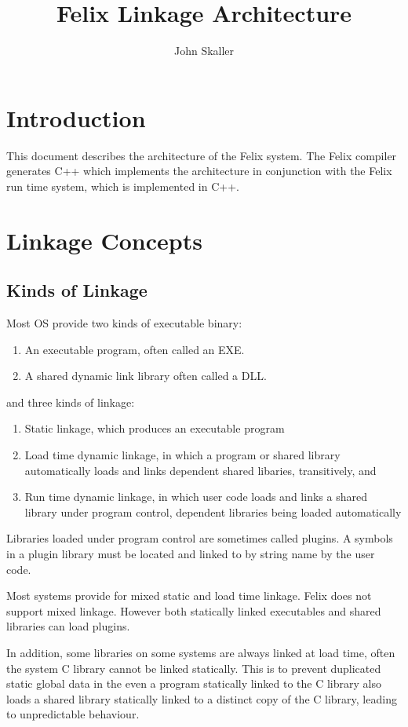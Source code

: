 \documentclass[oneside]{book}
\title{Felix Linkage Architecture}
\author{John Skaller}
\begin{document}
\maketitle
\tableofcontents
\chapter{Introduction}
This document describes the architecture of the Felix system.
The Felix compiler generates C++ which implements the architecture
in conjunction with the Felix run time system, which is implemented in C++.

\chapter{Linkage Concepts}
\section{Kinds of Linkage}
Most OS provide two kinds of executable binary: 
\begin{enumerate}
\item An executable program, often called an EXE.
\item A shared dynamic link library often called a DLL.
\end{enumerate}

and three kinds of linkage:

\begin{enumerate}
\item Static linkage, which produces an executable program
\item Load time dynamic linkage, in which a program or shared library
automatically loads and links dependent shared libaries, transitively, and
\item Run time dynamic linkage, in which user code loads and links a
shared library under program control, dependent libraries being
loaded automatically
\end{enumerate}

Libraries loaded under program control are sometimes called
plugins. A symbols in a plugin library must be located and
linked to by string name by the user code.

Most systems provide for mixed static and load time linkage.
Felix does not support mixed linkage. However both statically linked
executables and shared libraries can load plugins.

In addition, some libraries on some systems are always linked at
load time, often the system C library cannot be linked statically.
This is to prevent duplicated static global data in the even
a program statically linked to the C library also loads a shared
library statically linked to a distinct copy of the C library,
leading to unpredictable behaviour.
\end{document}
